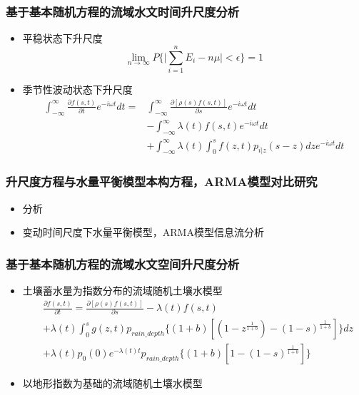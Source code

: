 \documentclass{beamer}
\begin{document}
\begin{CJK}{UTF8}{gkai}
\begin{frame}
\frametitle{基于基本随机方程的流域水文时间升尺度分析}
\begin{itemize}
\item 平稳状态下升尺度
\begin{equation}
\lim_{n\to\infty}P\lbrace\vert\sum_{i=1}^n E_i-n\mu\vert<\epsilon\rbrace=1
\end{equation}
\item 季节性波动状态下升尺度
 \begin{equation}
 \begin{split}
 \int_{-\infty}^{\infty}\frac{\partial{f(s,t)}}{\partial t}e^{-i\omega t}dt=&\int_{-\infty}^{\infty}\frac{\partial{[\rho(s)f(s,t)]}}{\partial s}e^{-i\omega t}dt\\&-\int_{-\infty}^{\infty}\lambda(t)f(s,t)e^{-i\omega t}dt\\&+\int_{-\infty}^{\infty}\lambda(t)\int_{0}^{s} f(z,t)p_{i|z}(s-z)dze^{-i\omega t}dt
 \end{split}
 \end{equation}
\end{itemize}
\end{frame}

\begin{frame}
\frametitle{升尺度方程与水量平衡模型本构方程，ARMA模型对比研究}
\begin{itemize}
\item 分析
\item 变动时间尺度下水量平衡模型，ARMA模型信息流分析
\end{itemize}
\end{frame}

\begin{frame}
\frametitle{基于基本随机方程的流域水文空间升尺度分析}
\begin{itemize}
\item 土壤蓄水量为指数分布的流域随机土壤水模型 
 \begin{equation}
 \begin{split}
 &\frac{\partial{f(s,t)}}{\partial t}=\frac{\partial{[\rho(s)f(s,t)]}}{\partial s}-\lambda(t)f(s,t)\\&+\lambda(t)\int_{0}^{s} g(z,t)p_{rain\_depth} \lbrace(1+b)[(1-z^{\frac{1}{1+b}})-(1-s)^{\frac{1}{1+b}}]\rbrace dz\\&+\lambda(t)p_0(0)e^{-\lambda(t) t}p_{rain\_depth} \lbrace(1+b)[1-(1-s)^{\frac{1}{1+b}}]\rbrace
 \end{split}
 \end{equation}
\item 以地形指数为基础的流域随机土壤水模型
\end{itemize}
\end{frame}



\end{CJK}
\end{document}
